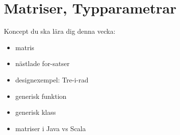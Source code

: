 \chapter{Matriser, Typparametrar}\label{chapter:W09}
Koncept du ska lära dig denna vecka:
\begin{multicols}{2}\begin{itemize}[nosep,label={$\square$},leftmargin=*]
\item matris
\item nästlade for-satser
\item designexempel: Tre-i-rad
\item generisk funktion
\item generisk klass
\item matriser i Java vs Scala\end{itemize}\end{multicols}
